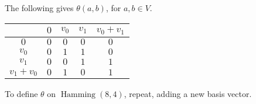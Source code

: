 \documentclass[nobib,a4paper,debug]{tufte-handout}
\DeclareMathOperator{\Hamming}{Hamming}
\begin{document}
\noindent 
The following gives $\theta(a,b)$, for $a,b\in V$.
\begin{center}
\begin{tabular}{c|cc|cc}
	\diagbox{a}{b} & $0$ & $v_0$ & $v_1$ & $v_0+v_1$ \\
	\hline
	$0$       		& $0$ & $0$ & $0$ & $0$ \\
	$v_0$     		& $0$ & $1$ & $1$ & $0$ \\
	\hline
	$v_1$     		& $0$ & $0$ & $1$ & $1$ \\
	$v_1+v_0$ 		& $0$ & $1$ & $0$ & $1$ \\
\end{tabular}
\end{center}

\noindent 
To define $\theta$ on $\Hamming(8,4)$, repeat, adding a new basis vector.



\end{document}
